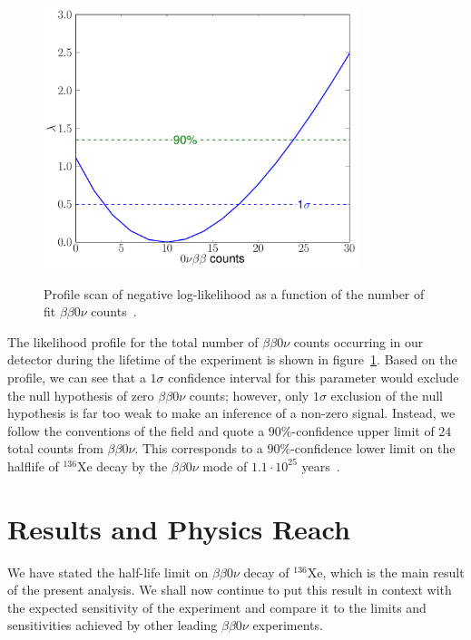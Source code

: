 \begin{figure}
\begin{center}
\includegraphics[keepaspectratio=true,height=3in]{0nubb_profile_frompaper.pdf}
\end{center}
\renewcommand{\baselinestretch}{1}
\small\normalsize
\begin{quote}
\caption{Profile scan of negative log-likelihood as a function of the number of fit $\beta\beta 0\nu$ counts~\cite{NewEXObb0nPaper_2014}.}
\label{fig:bb0nProfileFromPaper}
\end{quote}
\end{figure}
\renewcommand{\baselinestretch}{2}
\small\normalsize

The likelihood profile for the total number of $\beta\beta 0\nu$ counts occurring in our detector during the lifetime of the experiment is shown in figure~\ref{fig:bb0nProfileFromPaper}.  Based on the profile, we can see that a $1\sigma$ confidence interval for this parameter would exclude the null hypothesis of zero $\beta\beta 0\nu$ counts; however, only $1\sigma$ exclusion of the null hypothesis is far too weak to make an inference of a non-zero signal.  Instead, we follow the conventions of the field and quote a $90\%$-confidence upper limit of $24$ total counts from $\beta\beta 0\nu$.  This corresponds to a $90\%$-confidence lower limit on the halflife of $^{136}$Xe decay by the $\beta\beta 0\nu$ mode of $1.1 \cdot 10^{25}$ years~\cite{NewEXObb0nPaper_2014}.

\section{Results and Physics Reach}\label{sec:ResultResults}

We have stated the half-life limit on $\beta\beta 0\nu$ decay of $^{136}$Xe, which is the main result of the present analysis.  We shall now continue to put this result in context with the expected sensitivity of the experiment and compare it to the limits and sensitivities achieved by other leading $\beta\beta 0\nu$ experiments.

